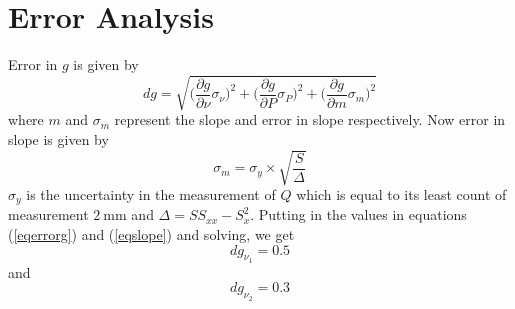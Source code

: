 \documentclass[%
 reprint,
nofootinbib,
 amsmath,amssymb,
 aps,
floatfix,
]{revtex4-2}
\begin{document}
\section{Error Analysis}
    Error in $g$ is given by
    \begin{equation}
    \label{eqerrorg}
        dg = \sqrt{\Big(\dfrac{\partial g}{\partial \nu} \sigma_{\nu}\Big)^2 + \Big(\dfrac{\partial g}{\partial P} \sigma_{P}\Big)^2 + \Big(\dfrac{\partial g}{\partial m} \sigma_{m}\Big)^2}
    \end{equation}
    where $m$ and $\sigma_m$ represent the slope and error in slope respectively. Now error in slope is given by
    \begin{equation}
    \label{eqslope}
        \sigma_m = \sigma_y \times \sqrt{\dfrac{S}{\Delta}}
    \end{equation}
    $\sigma_y$ is the uncertainty in the measurement of $Q$ which is equal to its least count of measurement $\SI{2}{\milli \metre}$ and $\Delta = S S_{xx} - S_x^2$. Putting in the values in equations (\ref{eqerrorg}) and (\ref{eqslope}) and solving, we get
    \begin{equation}
        \boxed{d g_{\nu_1} = 0.5}
    \end{equation}
    and
    \begin{equation}
        \boxed{d g_{\nu_2} = 0.3}
    \end{equation}

        
\end{document}
